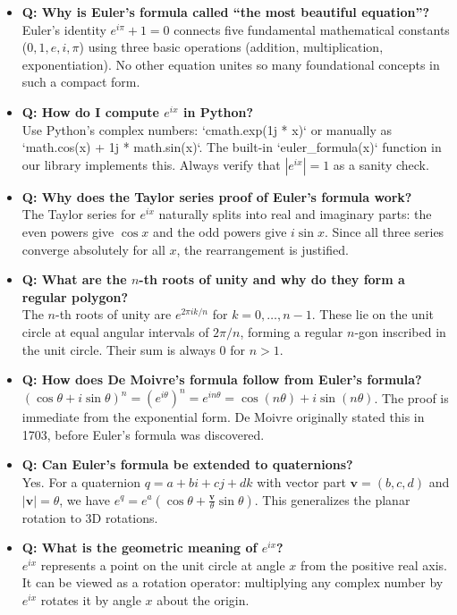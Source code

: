 \begin{itemize}
\item \textbf{Q: Why is Euler's formula called ``the most beautiful equation''?} \\
Euler's identity $e^{i\pi} + 1 = 0$ connects five fundamental mathematical constants ($0, 1, e, i, \pi$) using three basic operations (addition, multiplication, exponentiation). No other equation unites so many foundational concepts in such a compact form.

\item \textbf{Q: How do I compute $e^{ix}$ in Python?} \\
Use Python's complex numbers: `cmath.exp(1j * x)` or manually as `math.cos(x) + 1j * math.sin(x)`. The built-in `euler_formula(x)` function in our library implements this. Always verify that $|e^{ix}| = 1$ as a sanity check.

\item \textbf{Q: Why does the Taylor series proof of Euler's formula work?} \\
The Taylor series for $e^{ix}$ naturally splits into real and imaginary parts: the even powers give $\cos x$ and the odd powers give $i \sin x$. Since all three series converge absolutely for all $x$, the rearrangement is justified.

\item \textbf{Q: What are the $n$-th roots of unity and why do they form a regular polygon?} \\
The $n$-th roots of unity are $e^{2\pi i k/n}$ for $k = 0, \ldots, n-1$. These lie on the unit circle at equal angular intervals of $2\pi/n$, forming a regular $n$-gon inscribed in the unit circle. Their sum is always 0 for $n > 1$.

\item \textbf{Q: How does De Moivre's formula follow from Euler's formula?} \\
$(\cos \theta + i \sin \theta)^n = (e^{i\theta})^n = e^{in\theta} = \cos(n\theta) + i \sin(n\theta)$. The proof is immediate from the exponential form. De Moivre originally stated this in 1703, before Euler's formula was discovered.

\item \textbf{Q: Can Euler's formula be extended to quaternions?} \\
Yes. For a quaternion $q = a + bi + cj + dk$ with vector part $\mathbf{v} = (b,c,d)$ and $|\mathbf{v}| = \theta$, we have $e^q = e^a (\cos \theta + \frac{\mathbf{v}}{\theta} \sin \theta)$. This generalizes the planar rotation to 3D rotations.

\item \textbf{Q: What is the geometric meaning of $e^{ix}$?} \\
$e^{ix}$ represents a point on the unit circle at angle $x$ from the positive real axis. It can be viewed as a rotation operator: multiplying any complex number by $e^{ix}$ rotates it by angle $x$ about the origin.
\end{itemize}

